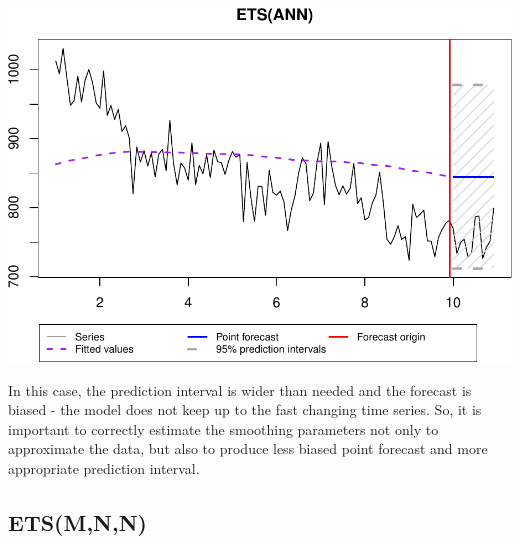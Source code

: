 \documentclass[
]{book}
\theoremstyle{definition}
\theoremstyle{definition}
\theoremstyle{definition}
\theoremstyle{definition}
\theoremstyle{remark}
\begin{document}
\includegraphics{adam_files/figure-latex/ETSANNExamplealpha0.1-1.pdf}

In this case, the prediction interval is wider than needed and the forecast is biased - the model does not keep up to the fast changing time series. So, it is important to correctly estimate the smoothing parameters not only to approximate the data, but also to produce less biased point forecast and more appropriate prediction interval.

\hypertarget{etsmnn}{%
\subsection{ETS(M,N,N)}\label{etsmnn}}
\end{document}
